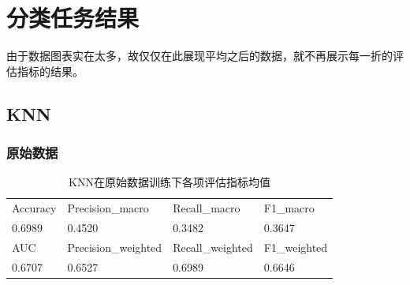 \documentclass[10pt]{article}
\begin{document}
\section{分类任务结果}
由于数据图表实在太多，故仅仅在此展现平均之后的数据，就不再展示每一折的评估指标的结果。
\subsection{KNN}
\subsubsection*{原始数据}
\begin{table}[H]
  \centering
  \caption{KNN在原始数据训练下各项评估指标均值}
  \begin{tabular}{llll}
  \toprule
  Accuracy & Precision\_macro & Recall\_macro & F1\_macro \\
  0.6989 & 0.4520 & 0.3482 & 0.3647 \\
  \midrule
  AUC & Precision\_weighted & Recall\_weighted & F1\_weighted \\
  0.6707 & 0.6527 & 0.6989 & 0.6646 \\
  \bottomrule
  \end{tabular}
\end{table}
\end{document}
